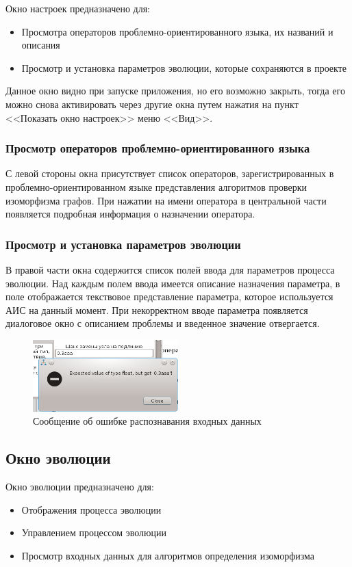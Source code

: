 \documentclass[russian,utf8,emptystyle]{eskdtext}
\begin{document}
Окно настроек предназначено для:
\begin{itemize}
\item Просмотра операторов проблемно-ориентированного языка, их названий и описания
\item Просмотр и установка параметров эволюции, которые сохраняются в проекте
\end{itemize}

Данное окно видно при запуске приложения, но его возможно закрыть, тогда его можно снова активировать через другие окна путем нажатия на пункт <<Показать окно настроек>> меню <<Вид>>.

\subsubsection{Просмотр операторов проблемно-ориентированного языка}
С левой стороны окна присутствует список операторов, зарегистрированных в проблемно-ориентированном языке представления алгоритмов проверки изоморфизма графов. При нажатии на имени оператора в центральной части появляется подробная информация о назначении оператора.

\subsubsection{Просмотр и установка параметров эволюции}
В правой части окна содержится список полей ввода для параметров процесса эволюции. Над каждым полем ввода имеется описание назначения параметра, в поле отображается текствовое представление параметра, которое используется АИС на данный момент. При некорректном вводе параметра появляется диалоговое окно с описанием проблемы и введенное значение отвергается.

\begin{figure}[h!]
\centering
\includegraphics[width=0.5\textwidth]{screen08}
\caption{Сообщение об ошибке распознавания входных данных}
\end{figure}

\subsection{Окно эволюции}
Окно эволюции предназначено для:
\begin{itemize}
\item Отображения процесса эволюции
\item Управлением процессом эволюции
\item Просмотр входных данных для алгоритмов определения изоморфизма
\end{itemize}
\end{document}
